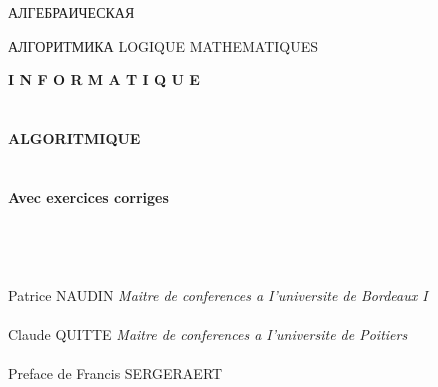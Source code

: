 \documentclass{mai_book}
\begin{document}
\hspace{3.4in}АЛГЕБРАИЧЕСКАЯ

\hspace{3.4in}АЛГОРИТМИКА
\newpage
\hspace{3.0in} LOGIQUE MATHEMATIQUES

 \hspace{3.1in} \textbf{I N F O R M A T I Q U E}
\\\\\\
{\Huge \textbf {ALGORITMIQUE}}
\\
\\\\
\Large{ \textbf{Avec exercices corriges}}
\\\\\\\\\\
\normalsize {Patrice NAUDIN}
\newline \textit {\normalsize {Maitre de conferences a I'universite de Bordeaux I}}
\\\\
\normalsize {Claude QUITTE}
\newline \textit {Maitre de conferences a I'universite de Poitiers}
\\\\
\normalsize {Preface de Francis SERGERAERT}
\\\\\\\\\\\\\\\\\\\\\\\\\\\\\\\\\\\\\\\\\
\end{document}
